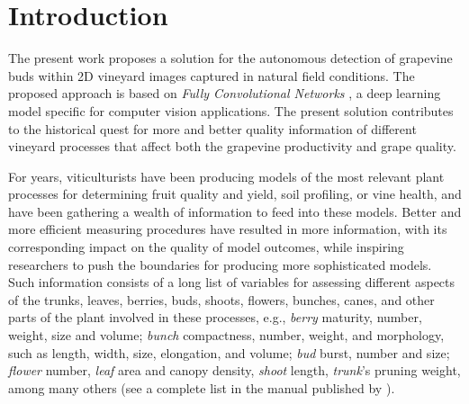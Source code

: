 \documentclass[a4paper,authoryear,review]{elsarticle}
\begin{document}
\linenumbers



\section{Introduction}

The present work proposes a solution for the autonomous detection of grapevine buds within 2D vineyard images captured in natural field conditions. The proposed approach is based on \emph{Fully Convolutional Networks} \citep{long2015fully, shelhamer2017fully}, a deep learning model specific for computer vision applications. The present solution contributes to the historical quest for more and better quality information of different vineyard processes that affect both the grapevine productivity and grape quality. 

For years, viticulturists have been producing models of the most relevant plant processes for determining  fruit quality and yield, soil profiling, or vine health, and have been gathering a wealth of information to feed into these models. Better and more efficient measuring procedures have resulted in more information, with its corresponding impact on the quality of model outcomes, while inspiring researchers to push the boundaries for producing more sophisticated models. Such information consists of a long list of variables for assessing different aspects of the trunks, leaves, berries, buds, shoots, flowers, bunches, canes, and other parts of the plant  involved in these processes, e.g.,   \emph{berry} maturity, number, weight, size and volume; \emph{bunch} compactness, number, weight, and morphology, such as length, width, size, elongation, and volume; \emph{bud} burst, number and size; \emph{flower} number, \emph{leaf} area and canopy density, \emph{shoot} length, \emph{trunk}’s pruning weight, among many others (see a complete list in the manual published by \cite{awriNDmanual1, awriNDmanual3}).
\end{document}
